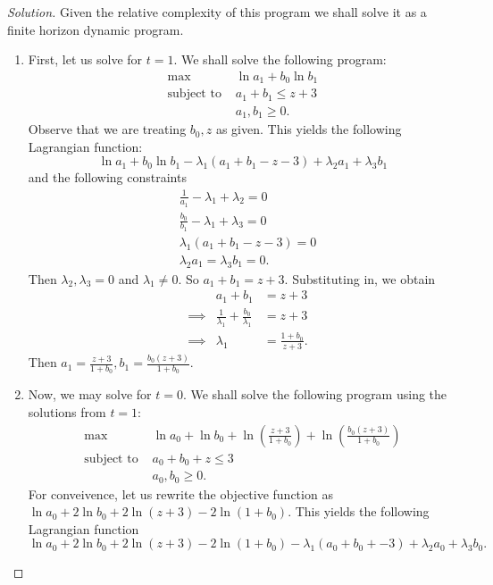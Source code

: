 \documentclass[12pt]{article}
\theoremstyle{definition}
\theoremstyle{remark}
\def\la{\lambda}
\begin{document}
\begin{proof}[Solution]
  Given the relative complexity of this program we shall solve it as a finite horizon dynamic program.
  \begin{enumerate}
    \item
      First, let us solve for $t = 1$. We shall solve the following program:
      \begin{align*}
        \max &\ln a_1 + b_0\ln b_1 \\
        \text{subject to } &a_1 + b_1 \leq z + 3 \\
        &a_1, b_1 \geq 0.
      \end{align*}
      Observe that we are treating $b_0, z$ as given. This yields the following Lagrangian function:
      $$ \ln a_1 + b_0\ln b_1 - \la_1(a_1 + b_1 - z - 3) + \la_2a_1 + \la_3b_1 $$
      and the following constraints
      \begin{align*}
        &\frac{1}{a_1} - \la_1 + \la_2 = 0 \\
        &\frac{b_0}{b_1} - \la_1 + \la_3 = 0 \\
        &\la_1(a_1 + b_1 - z - 3) = 0 \\
        &\la_2a_1 = \la_3b_1 = 0.
      \end{align*}
      Then $\la_2, \la_3 = 0$ and $\la_1 \neq 0$. So $a_1 + b_1 = z + 3$. Substituting in, we obtain
      \begin{align*}
        &          &a_1 + b_1 &= z + 3 \\
        & \implies &\frac{1}{\la_1} + \frac{b_0}{\la_1} &= z + 3 \\
        & \implies & \la_1 &= \frac{1 + b_0}{z + 3}.
      \end{align*}
      Then $a_1 = \frac{z + 3}{1 + b_0}, b_1 = \frac{b_0(z + 3)}{1 + b_0}$.
    \item
      Now, we may solve for $t = 0$. We shall solve the following program using the solutions from $t = 1$:
      \begin{align*}
        \max & \ln a_0 + \ln b_0 + \ln \left( \frac{z + 3}{1 + b_0} \right) + \ln \left( \frac{b_0(z + 3)}{1 + b_0} \right) \\
        \text{subject to } &a_0 + b_0 + z \leq 3 \\
        &a_0, b_0 \geq 0.
      \end{align*}
      For conveivence, let us rewrite the objective function as $\ln a_0 + 2\ln b_0 + 2 \ln(z + 3) - 2 \ln(1 + b_0)$. This yields the following Lagrangian function
      $$ \ln a_0 + 2\ln b_0 + 2 \ln(z + 3) - 2 \ln(1 + b_0) - \la_1(a_0 + b_0 + - 3) + \la_2a_0 +  \la_3b_0. $$

\end{enumerate}
\end{proof}
\end{document}
